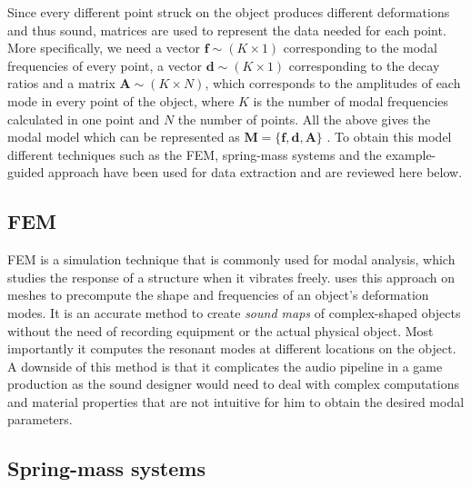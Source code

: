 Since every different point struck on the object produces different deformations and thus sound, matrices are used to represent the data needed for each point. More specifically, we need a vector $\textbf{f}\sim (K \times 1)$  corresponding to the modal frequencies of every point, a vector $\textbf{d}\sim (K \times 1)$ corresponding to the decay ratios and a matrix $\textbf{A}\sim (K \times N)$, which corresponds to the amplitudes of each mode in every point of the object, where $K$ is the number of modal frequencies calculated in one point and $N$ the number of points. All the above gives the modal model which can be represented as $\textbf{M} = \{\textbf{f}, \textbf{d}, \textbf{A}\}$ \cite{van2001foleyautomatic}. To obtain this model different techniques such as the \gls{FEM}, spring-mass systems and the example-guided approach have been used for data extraction and are reviewed here below.


\subsection{FEM}\label{sec:fem}

\gls{FEM} is a simulation technique that is commonly used for modal analysis, which studies the response of a structure when it vibrates freely. \cite{o2002synthesizing} uses this approach on meshes to precompute the shape and frequencies of an object's deformation modes. It is an accurate method to create \textit{sound maps} of complex-shaped objects without the need of recording equipment or the actual physical object. Most importantly it computes the resonant modes at different locations on the object. A downside of this method is that it complicates the audio pipeline in a game production as the sound designer would need to deal with complex computations and material properties that are not intuitive for him to obtain the desired modal parameters.

\subsection{Spring-mass systems}\label{sec:springmass}

